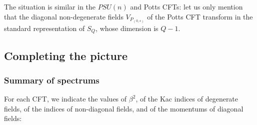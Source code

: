 \documentclass[12pt, a4paper]{article}
\begin{document}
The situation is similar in the $PSU(n)$ and Potts CFTs: let us only mention that the diagonal non-degenerate fields $V_{P_{(0,s)}}$ of the Potts CFT transform in the standard  representation of $S_Q$, whose dimension is $Q-1$. 


\subsection{Completing the picture}

\subsubsection{Summary of spectrums}

For each CFT, we indicate the values of $\beta^2$, of the Kac indices of degenerate fields, of the indices of non-diagonal fields, and of the momentums of diagonal fields:
\end{document}
